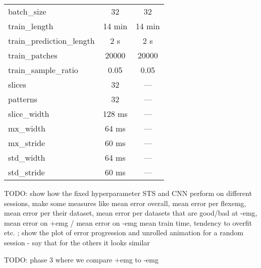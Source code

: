 {\begin{longtable}{l|c|c}
batch\_size                    & 32           & 32           \\
train\_length                  & 14 min       & 14 min       \\
train\_prediction\_length      & 2 s          & 2 s          \\
train\_patches                 & 20000        & 20000        \\
train\_sample\_ratio           & 0.05         & 0.05         \\
slices                         & 32           & ---          \\
patterns                       & 32           & ---          \\
slice\_width                   & 128 ms       & ---          \\
mx\_width                      & 64 ms        & ---          \\
mx\_stride                     & 60 ms        & ---          \\
std\_width                     & 64 ms        & ---          \\
std\_stride                    & 60 ms        & ---          \\
\hline
\end{longtable}
}

TODO: show how the fixed hyperparameter STS and CNN perform on different sessions, make some measures like mean error overall, mean error per flexemg, mean error per their dataset, mean error per datasets that are good/bad at -emg, mean error on +emg / mean error on -emg mean train time, tendency to overfit etc. ; show the plot of error progression and unrolled animation for a random session - say that for the others it looks similar


TODO: phase 3 where we compare +emg to -emg